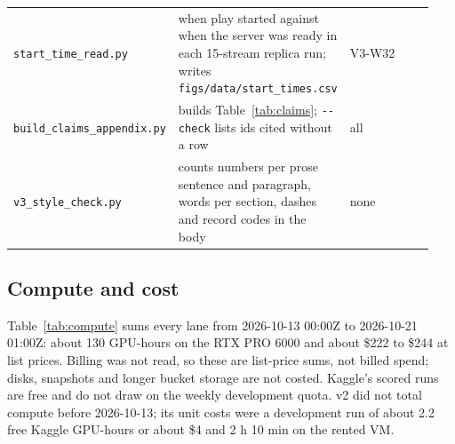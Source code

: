 \begin{table}[!htb]
\begin{tabular}{@{}>{\raggedright\arraybackslash}p{0.30\linewidth}>{\raggedright\arraybackslash}p{0.40\linewidth}>{\raggedright\arraybackslash}p{0.24\linewidth}@{}}
\texttt{start\_\allowbreak{}time\_\allowbreak{}read.py} & when play started against when the server was ready in each 15-stream replica run; writes \texttt{figs/\allowbreak{}data/\allowbreak{}start\_\allowbreak{}times.csv} & V3-W32 \\
\texttt{build\_\allowbreak{}claims\_\allowbreak{}appendix.py} & builds Table~\ref{tab:claims}; \texttt{-{}-check} lists ids cited without a row & all \\
\texttt{v3\_\allowbreak{}style\_\allowbreak{}check.py} & counts numbers per prose sentence and paragraph, words per section, dashes and record codes in the body & none \\
\bottomrule
\end{tabular}
\end{table}

\subsection{Compute and cost}\label{app:compute}
Table~\ref{tab:compute} sums every lane from 2026-10-13 00:00Z to 2026-10-21 01:00Z: about 130 GPU-hours on the RTX PRO 6000 and about \$222 to \$244 at list prices. %
Billing was not read, so these are list-price sums, not billed spend; disks, snapshots and longer bucket storage are not costed. %
Kaggle's scored runs are free and do not draw on the weekly development quota. %
v2 did not total compute before 2026-10-13; its unit costs were a development run of about 2.2 free Kaggle GPU-hours or about \$4 and 2 h 10 min on the rented VM. %

